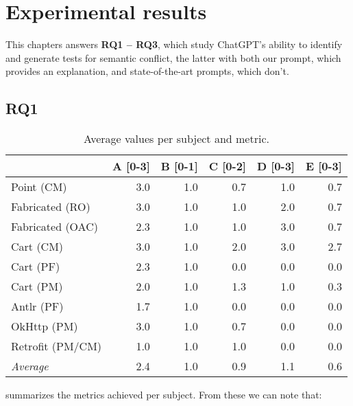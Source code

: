     \chapter{Experimental results}\label{chap:results}

This chapters answers \textbf{RQ1 – RQ3}, which study ChatGPT's ability to identify and generate tests for semantic conflict, the latter
with both our prompt, which provides an explanation, and state-of-the-art prompts, which don't.

\section{RQ1}\label{sec:results:rq1}

\begin{table}[t]
\centering
\begin{tabular}{@{\extracolsep{\fill}} lrrrrr} \toprule
                 & A [0-3] & B [0-1] & C [0-2] & D [0-3] & E [0-3] \\
\midrule
Point (CM)       & 3.0 & 1.0 & 0.7 & 1.0 & 0.7 \\
Fabricated (RO)  & 3.0 & 1.0 & 1.0 & 2.0 & 0.7 \\
Fabricated (OAC) & 2.3 & 1.0 & 1.0 & 3.0 & 0.7 \\
Cart (CM)        & 3.0 & 1.0 & 2.0 & 3.0 & 2.7 \\
Cart (PF)        & 2.3 & 1.0 & 0.0 & 0.0 & 0.0 \\
Cart (PM)        & 2.0 & 1.0 & 1.3 & 1.0 & 0.3 \\
Antlr (PF)       & 1.7 & 1.0 & 0.0 & 0.0 & 0.0 \\
OkHttp (PM)      & 3.0 & 1.0 & 0.7 & 0.0 & 0.0 \\
Retrofit (PM/CM) & 1.0 & 1.0 & 1.0 & 0.0 & 0.0 \\
\midrule
\textit{Average}  & 2.4 & 1.0 & 0.9 & 1.1 & 0.6 \\
\bottomrule
\end{tabular}
\caption{Average values per subject and metric.\label{tab:results:rq1}}
\end{table}

 summarizes the metrics achieved per subject. From these we can note that:

